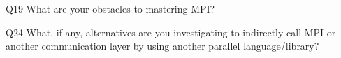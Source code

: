 \begin{description}%
\item{Q19} What are your obstacles to mastering MPI?%
\item{Q24} What, if any, alternatives are you investigating to indirectly call MPI or another communication layer by using another parallel language/library?%
\end{description}%
